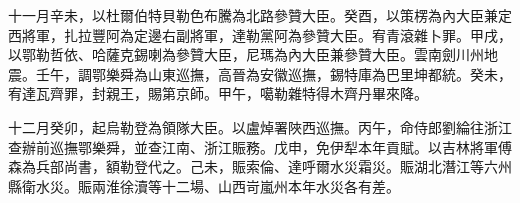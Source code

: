 \begin{pinyinscope}
十一月辛未，以杜爾伯特貝勒色布騰為北路參贊大臣。癸酉，以策楞為內大臣兼定西將軍，扎拉豐阿為定邊右副將軍，達勒黨阿為參贊大臣。宥青滾雜卜罪。甲戌，以鄂勒哲依、哈薩克錫喇為參贊大臣，尼瑪為內大臣兼參贊大臣。雲南劍川州地震。壬午，調鄂樂舜為山東巡撫，高晉為安徽巡撫，錫特庫為巴里坤都統。癸未，宥達瓦齊罪，封親王，賜第京師。甲午，噶勒雜特得木齊丹畢來降。

十二月癸卯，起烏勒登為領隊大臣。以盧焯署陜西巡撫。丙午，命侍郎劉綸往浙江查辦前巡撫鄂樂舜，並查江南、浙江賑務。戊申，免伊犁本年貢賦。以吉林將軍傅森為兵部尚書，額勒登代之。己未，賑索倫、達呼爾水災霜災。賑湖北潛江等六州縣衛水災。賑兩淮徐瀆等十二場、山西岢嵐州本年水災各有差。


\end{pinyinscope}